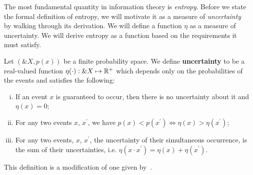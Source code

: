 The most fundamental quantity in information theory is
\textit{entropy}. Before we state the formal definition of entropy, we
will motivate it as a measure of \textit{uncertainty} by walking
through its derivation. We will define a function $\eta$ as a measure
of uncertainty. We will derive entropy as a function based on the
requirements it must satisfy.

\begin{definition}
  Let $(\&X, p(x))$ be a finite probability space. We define
  \textbf{uncertainty} to be a real-valued function $\eta(\cdot): \&X \mapsto
  \mathbb{R}^+$ which depends only on the probabilities of the events and satisfies the
  following:
  \begin{enumerate}[(i)]
  \item If an event $x$ is guaranteed to occur, then there is no uncertainty
    about it and $\eta(x) = 0$;
  \item For any two events $x$, $x^\prime$, we have $p(x) < p(x^\prime) \iff
    \eta(x) > \eta(x^\prime)$;
  \item For any two events, $x$, $x^\prime$, the uncertainty of their
    simultaneous occurrence, is the sum of their uncertainties, i.e. $\eta(x
    \cdot x^\prime) = \eta(x) + \eta(x^\prime)$.
  \end{enumerate}
\end{definition}
\begin{remark}
  This definition is a modification of one given by~\cite{ref:martin-2011}.
\end{remark}

